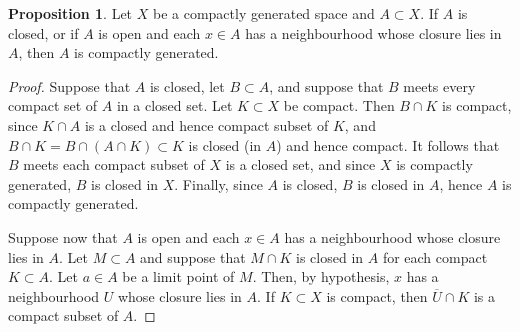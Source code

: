\documentclass{book}
\theoremstyle{definition}
\newtheorem{proposition}{Proposition}[section]
\theoremstyle{remark}
\begin{document}
\begin{proposition}
Let $X$ be a compactly generated space and $A\subset X$. If $A$ is closed, or if $A$ is open and each $x\in A$ has a neighbourhood whose closure lies in $A$, then $A$ is compactly generated.
\end{proposition}
\begin{proof}
Suppose that $A$ is closed, let $B\subset A$, and suppose that $B$ meets every compact set of $A$ in a closed set. Let $K\subset X$ be compact. Then $B\cap K$ is compact, since $K\cap A$ is a closed and hence compact subset of $K$, and $B\cap K=B\cap (A\cap K)\subset K$ is closed (in $A$) and hence compact. It follows that $B$ meets each compact subset of $X$ is a closed set, and since $X$ is compactly generated, $B$ is closed in $X$. Finally, since $A$ is closed, $B$ is closed in $A$, hence $A$ is compactly generated.

Suppose now that $A$ is open and each $x\in A$ has a neighbourhood whose closure lies in $A$. Let $M\subset A$ and suppose that $M\cap K$ is closed in $A$ for each compact $K\subset A$. Let $a\in A$ be a limit point of $M$. Then, by hypothesis, $x$ has a neighbourhood $U$ whose closure lies in $A$. If $K\subset X$ is compact, then $\overline U\cap K$ is a compact subset of $A$. 
\end{proof}
\end{document}
